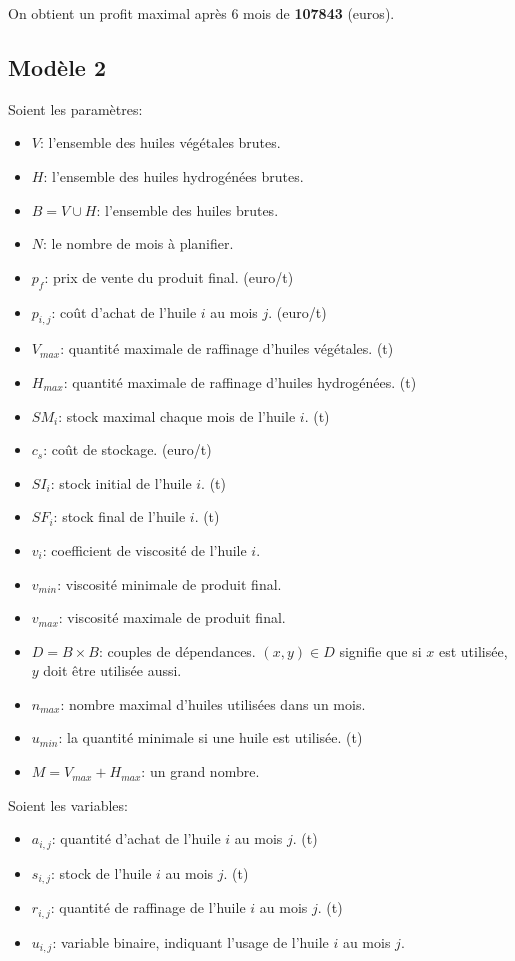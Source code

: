 \documentclass[10pt,a4paper]{article}
\begin{document}
On obtient un profit maximal après 6 mois de \textbf{107843} (euros).

\subsection{Modèle 2}
Soient les paramètres:
\begin{itemize}
    \item $V$: l'ensemble des huiles végétales brutes.
    \item $H$: l'ensemble des huiles hydrogénées brutes.
    \item $B = V \cup H$: l'ensemble des huiles brutes.
    \item $N$: le nombre de mois à planifier.
    \item $p_f$: prix de vente du produit final. (euro/t)
    \item $p_{i,j}$: coût d'achat de l'huile $i$ au mois $j$. (euro/t)
    \item $V_{max}$: quantité maximale de raffinage d'huiles végétales. (t)
    \item $H_{max}$: quantité maximale de raffinage d'huiles hydrogénées. (t)
    \item $SM_i$: stock maximal chaque mois de l'huile $i$. (t)
    \item $c_s$: coût de stockage. (euro/t)
    \item $SI_i$: stock initial de l'huile $i$. (t)
    \item $SF_i$: stock final de l'huile $i$. (t)
    \item $v_i$: coefficient de viscosité de l'huile $i$.
    \item $v_{min}$: viscosité minimale de produit final.
    \item $v_{max}$: viscosité maximale de produit final.
    \item $D = B \times B$: couples de dépendances. $(x, y) \in D$ signifie que si $x$ est utilisée, $y$ doit être utilisée aussi.
    \item $n_{max}$: nombre maximal d'huiles utilisées dans un mois.
    \item $u_{min}$: la quantité minimale si une huile est utilisée. (t)
    \item $M = V_{max} + H_{max}$: un grand nombre.
\end{itemize}

Soient les variables:
\begin{itemize}
    \item $a_{i,j}$: quantité d'achat de l'huile $i$ au mois $j$. (t)
    \item $s_{i,j}$: stock de l'huile $i$ au mois $j$. (t)
    \item $r_{i,j}$: quantité de raffinage de l'huile $i$ au mois $j$. (t)
    \item $u_{i,j}$: variable binaire, indiquant l'usage de l'huile $i$ au mois $j$.
\end{itemize}
\end{document}
